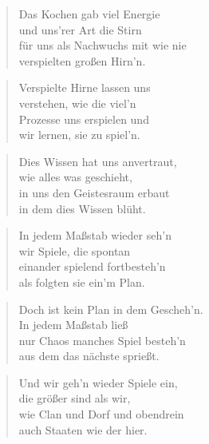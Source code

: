 \documentclass[10pt,a4paper]{article}
\begin{document}
\begin{multicols}{2}
\begin{verse}
Das Kochen gab viel Energie \\
und uns’rer Art die Stirn \\
für uns als Nachwuchs mit wie nie \\
verspielten großen Hirn’n. \\
\end{verse}

\begin{verse}
Verspielte Hirne lassen uns \\
verstehen, wie die viel’n \\
Prozesse uns erspielen und \\
wir lernen, sie zu spiel’n. \\
\end{verse}

\begin{verse}
Dies Wissen hat uns anvertraut, \\
wie alles was geschieht, \\
in uns den Geistesraum erbaut \\
in dem dies Wissen blüht. \\
\end{verse}

\begin{verse}
In jedem Maßstab wieder seh’n \\
wir Spiele, die spontan \\
einander spielend fortbesteh’n \\
als folgten sie ein’m Plan. \\
\end{verse}

\begin{verse}
Doch ist kein Plan in dem Gescheh’n. \\
In jedem Maßstab ließ \\
nur Chaos manches Spiel besteh’n \\
aus dem das nächste sprießt. \\
\end{verse}

\begin{verse}
Und wir geh’n wieder Spiele ein, \\
die größer sind als wir, \\
wie Clan und Dorf und obendrein \\
auch Staaten wie der hier. \\
\end{verse}


\end{multicols}
\end{document}
